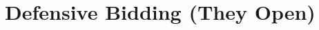 \documentclass[tom-ari]{subfile}
\begin{document}
	
	\chapter{Defensive Bidding (They Open)}
	
	\lipsum[4]
	
\end{document}
